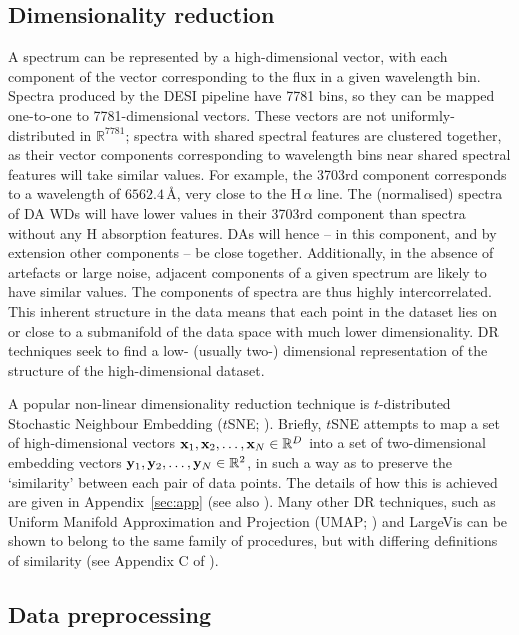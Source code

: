 \documentclass[fleqn,usenatbib]{mnras}
\def\xb{\vb{x}}
\def\yb{\vb{y}}
\begin{document}
\subsection{Dimensionality reduction}

A spectrum can be represented by a high-dimensional vector, with each component of the vector corresponding to the flux in a given wavelength bin.
Spectra produced by the DESI pipeline have 7781 bins, so they can be mapped one-to-one to 7781-dimensional vectors.
These vectors are not uniformly-distributed in $\mathbb{R}^{7781}$;
spectra with shared spectral features are clustered together, as their vector components corresponding to wavelength bins near shared spectral features will take similar values.
For example, the 3703rd component corresponds to a wavelength of $6562.4\,\text{\AA}$, very close to the H$\,\alpha$ line.
The (normalised) spectra of DA WDs will have lower values in their 3703rd component than spectra without any H absorption features.
DAs will hence -- in this component, and by extension other components -- be close together.
Additionally, in the absence of artefacts or large noise, adjacent components of a given spectrum are likely to have similar values.
The components of spectra are thus highly intercorrelated.
This inherent structure in the data means that each point in the dataset lies on or close to a submanifold of the data space with much lower dimensionality.
DR techniques seek to find a low- (usually two-) dimensional representation of the structure of the high-dimensional dataset.

A popular non-linear dimensionality reduction technique is $t$-distributed Stochastic Neighbour Embedding ($t$SNE; \citealt{tsne}).
Briefly, $t$SNE attempts to map a set of high-dimensional vectors $\xb_1, \xb_2, \dots, \xb_N \in \mathbb{R}^D$ into a set of two-dimensional embedding vectors $\yb_1, \yb_2, \dots, \yb_N \in \mathbb{R}^2$, in such a way as to preserve the `similarity' between each pair of data points.
The details of how this is achieved are given in Appendix~\ref{sec:app} (see also \citealt{tsne}).
Many other DR techniques, such as Uniform Manifold Approximation and Projection (UMAP; \citealt{umap}) and LargeVis \citep{largevis} can be shown to belong to the same family of procedures, but with differing definitions of similarity (see Appendix C of \citealt{umap}).


\subsection{Data preprocessing}
\label{sec:preprocessing}
\end{document}
